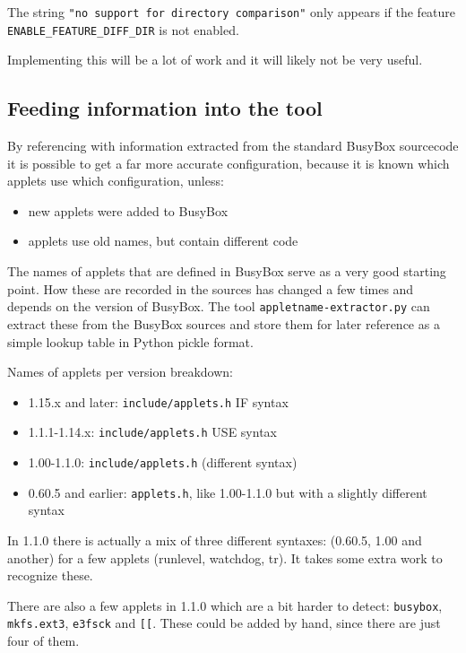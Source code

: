 \documentclass[10pt]{article}
\begin{document}
The string \texttt{"no support for directory comparison"} only appears if the
feature \texttt{ENABLE\_FEATURE\_DIFF\_DIR} is not enabled.

Implementing this will be a lot of work and it will likely not be very useful.

\subsection{Feeding information into the tool}

By referencing with information extracted from the standard BusyBox sourcecode
it is possible to get a far more accurate configuration, because it is known
which applets use which configuration, unless:

\begin{itemize}
\item new applets were added to BusyBox
\item applets use old names, but contain different code
\end{itemize}

The names of applets that are defined in BusyBox serve as a very good starting
point. How these are recorded in the sources has changed a few times and
depends on the version of BusyBox. The tool \texttt{appletname-extractor.py}
can extract these from the BusyBox sources and store them for later reference
as a simple lookup table in Python pickle format.

Names of applets per version breakdown:

\begin{itemize}
\item 1.15.x and later: \texttt{include/applets.h} IF syntax
\item 1.1.1-1.14.x: \texttt{include/applets.h} USE syntax
\item 1.00-1.1.0: \texttt{include/applets.h} (different syntax)
\item 0.60.5 and earlier: \texttt{applets.h}, like 1.00-1.1.0 but with a slightly different syntax
\end{itemize}

In 1.1.0 there is actually a mix of three different syntaxes: (0.60.5, 1.00 and another) for a few applets (runlevel, watchdog, tr). It takes some extra work to recognize these.

There are also a few applets in 1.1.0 which are a bit harder to detect:
\texttt{busybox}, \texttt{mkfs.ext3}, \texttt{e3fsck} and \texttt{[[}. These
could be added by hand, since there are just four of them.
\end{document}

